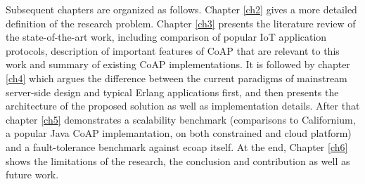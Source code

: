 Subsequent chapters are organized as follows. Chapter \ref{ch2} gives a more detailed definition of the research problem. Chapter \ref{ch3} presents the literature review of the state-of-the-art work, including comparison of popular IoT application protocols, description of important features of CoAP that are relevant to this work and summary of existing CoAP implementations. It is followed by chapter \ref{ch4} which argues the difference between the current paradigms of mainstream server-side design and typical Erlang applications first, and then presents the architecture of the proposed solution as well as implementation details. After that chapter \ref{ch5} demonstrates a scalability benchmark (comparisons to Californium, a popular Java CoAP implemantation, on both constrained and cloud platform) and a fault-tolerance benchmark 
against ecoap itself. At the end, Chapter \ref{ch6} shows the limitations of the research, the conclusion and contribution as well as future work.





